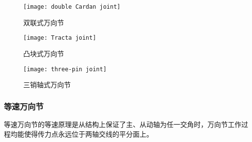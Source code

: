 \documentclass[UTF8]{ctexart}
\numberwithin{figure}{section}
\numberwithin{table}{section}
\begin{document}
\begin{figure}[htbp]
	\centering
	\begin{minipage}[b]{0.4\textwidth}
		\centering
		\texttt{[image: double Cardan joint]}
		\caption{双联式万向节}
		\label{double Cardan joint}
	\end{minipage}
	\begin{minipage}[b]{0.5\textwidth}
		\centering
		\texttt{[image: Tracta joint]}
		\caption{凸块式万向节}
		\label{Tracta joint}
	\end{minipage}
	\begin{minipage}[b]{0.4\textwidth}
		\centering
		\texttt{[image: three-pin joint]}
		\caption{三销轴式万向节}
		\label{three-pin joint}
	\end{minipage}
\end{figure}

\subsubsection{等速万向节}

等速万向节的等速原理是从结构上保证了主、从动轴为任一交角时，万向节工作过程均能使得传力点永远位于两轴交线的平分面上。
\end{document}
